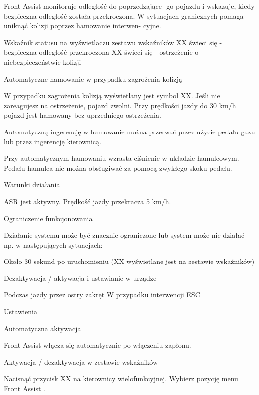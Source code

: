 Front Assist monitoruje odległość do poprzedzające-
go pojazdu i wskazuje, kiedy bezpieczna odległość
została przekroczona. W sytuacjach granicznych pomaga uniknąć kolizji poprzez hamowanie interwen-
cyjne.

Wskaźnik statusu na wyświetlaczu zestawu
wskaźników
XX świeci się - bezpieczna odległość przekroczona
XX świeci się - ostrzeżenie o niebezpieczeństwie kolizji

Automatyczne hamowanie w przypadku zagrożenia kolizją

W przypadku zagrożenia kolizją wyświetlany jest symbol XX. Jeśli nie zareagujesz na ostrzeżenie, pojazd zwolni.
Przy prędkości jazdy do 30 km/h pojazd jest hamowany bez uprzedniego ostrzeżenia.

Automatyczną ingerencję w hamowanie można przerwać przez użycie pedału gazu lub przez ingerencję kierownicą.

Przy automatycznym hamowaniu wzrasta ciśnienie w układzie hamulcowym. Pedału hamulca nie można obsługiwać za pomocą zwykłego skoku pedału.

Warunki działania

\begin{itemizeTick}
	\itemTick ASR jest aktywny.
	\itemTick Prędkość jazdy przekracza 5 km/h.
\end{itemizeTick}

Ograniczenie funkcjonowania

Działanie systemu może być znacznie ograniczone lub system może nie działać np. w następujących sytuacjach:

\begin{itemizeTriangle}
	\itemTriangle Około 30 sekund po uruchomieniu (XX wyświetlane jest na zestawie wskaźników)
\end{itemizeTriangle}
Dezaktywacja / aktywacja i ustawianie w urządze-
\begin{itemizeTriangle}
	\itemTriangle Podczas jazdy przez ostry zakręt
	\itemTriangle W przypadku interwencji ESC
\end{itemizeTriangle}

Ustawienia

Automatyczna aktywacja

Front Assist włącza się automatycznie po włączeniu zapłonu.

Aktywacja / dezaktywacja w zestawie wskaźników
\begin{itemizeArrow}
	\itemArrow Nacisnąć przycisk XX na kierownicy wielofunkcyjnej.
	\itemArrow Wybierz pozycję menu Front Assist .
\end{itemizeArrow}

